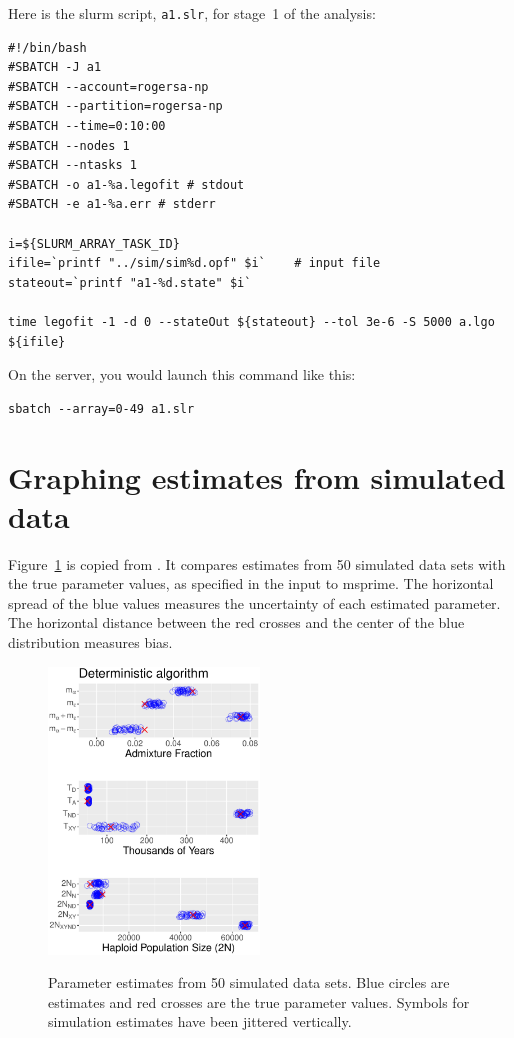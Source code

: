\documentclass[11pt]{article}
\begin{document}
Here is the slurm script, \texttt{a1.slr}, for stage~1 of the analysis:
\begin{verbatim}
#!/bin/bash
#SBATCH -J a1
#SBATCH --account=rogersa-np
#SBATCH --partition=rogersa-np
#SBATCH --time=0:10:00
#SBATCH --nodes 1
#SBATCH --ntasks 1
#SBATCH -o a1-%a.legofit # stdout
#SBATCH -e a1-%a.err # stderr

i=${SLURM_ARRAY_TASK_ID}
ifile=`printf "../sim/sim%d.opf" $i`    # input file
stateout=`printf "a1-%d.state" $i`

time legofit -1 -d 0 --stateOut ${stateout} --tol 3e-6 -S 5000 a.lgo ${ifile}
\end{verbatim}
On the server, you would launch this command like this:
\begin{verbatim}
sbatch --array=0-49 a1.slr
\end{verbatim}

\section{Graphing estimates from simulated data}

Figure~\ref{fig.dot} is copied from \citet{Rogers:PCJ-2-e32}. It
compares estimates from 50 simulated data sets with the true parameter
values, as specified in the input to msprime. The horizontal spread of
the blue values measures the uncertainty of each estimated
parameter. The horizontal distance between the red crosses and the
center of the blue distribution measures bias.

\begin{figure}
  {\centering\includegraphics[width=0.5\textwidth]{det-msp-dot.pdf}\\}
  \caption{Parameter estimates from 50 simulated data sets. Blue
    circles are estimates and red crosses are the true parameter
    values. Symbols for simulation estimates have been jittered
    vertically.}
  \label{fig.dot}
\end{figure}
\end{document}
